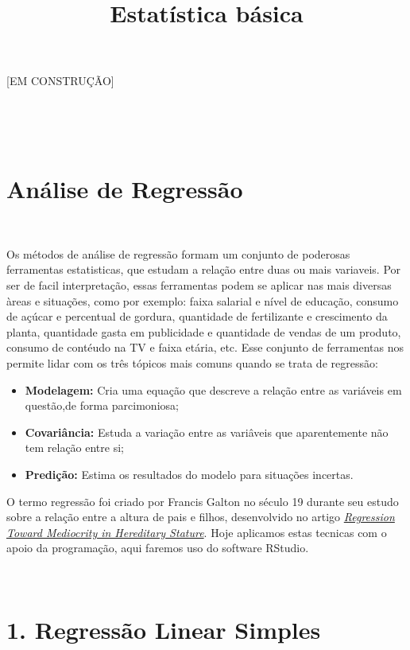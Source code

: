 \documentclass[
]{article}
\title{Estatística básica}
\author{}
\date{\vspace{-2.5em}}
\providecommand{\tightlist}{%
  \setlength{\itemsep}{0pt}\setlength{\parskip}{0pt}}
\begin{document}
\maketitle

{
\setcounter{tocdepth}{1}
\tableofcontents
}
{[}EM CONSTRUÇÃO{]}

~

~

\hypertarget{anuxe1lise-de-regressuxe3o}{%
\section{Análise de Regressão}\label{anuxe1lise-de-regressuxe3o}}

~

Os métodos de análise de regressão formam um conjunto de poderosas
ferramentas estatisticas, que estudam a relação entre duas ou mais
variaveis. Por ser de facil interpretação, essas ferramentas podem se
aplicar nas mais diversas àreas e situações, como por exemplo: faixa
salarial e nível de educação, consumo de açúcar e percentual de gordura,
quantidade de fertilizante e crescimento da planta, quantidade gasta em
publicidade e quantidade de vendas de um produto, consumo de contéudo na
TV e faixa etária, etc. Esse conjunto de ferramentas nos permite lidar
com os três tópicos mais comuns quando se trata de regressão:

\begin{itemize}
\tightlist
\item
  \textbf{Modelagem:} Cria uma equação que descreve a relação entre as
  variáveis em questão,de forma parcimoniosa;
\item
  \textbf{Covariância:} Estuda a variação entre as variâveis que
  aparentemente não tem relação entre si;
\item
  \textbf{Predição:} Estima os resultados do modelo para situações
  incertas.
\end{itemize}

O termo regressão foi criado por Francis Galton no século 19 durante seu
estudo sobre a relação entre a altura de pais e filhos, desenvolvido no
artigo
\href{https://galton.org/essays/1880-1889/galton-1886-jaigi-regression-stature.pdf}{\emph{Regression
Toward Mediocrity in Hereditary Stature}}. Hoje aplicamos estas tecnicas
com o apoio da programação, aqui faremos uso do software RStudio.

~

\hypertarget{regressuxe3o-linear-simples}{%
\section{1. Regressão Linear
Simples}\label{regressuxe3o-linear-simples}}
\end{document}
